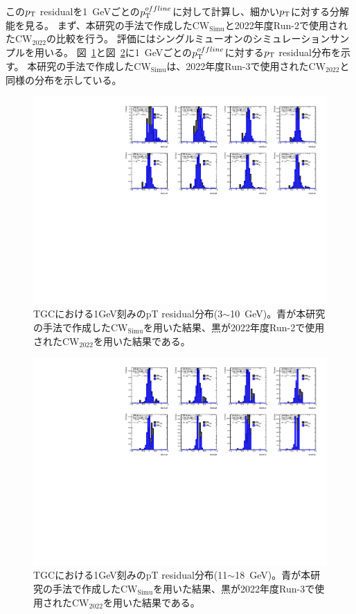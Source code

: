 この$p_{\rm{T}}$ residualを1~GeVごとの$p_{\rm{T}}^{offline}$に対して計算し、細かい$p_{\rm{T}}$に対する分解能を見る。
まず、本研究の手法で作成した$\mathrm{CW_{Simu}}$と2022年度Run-2で使用された$\mathrm{CW_{2022}}$の比較を行う。
評価にはシングルミューオンのシミュレーションサンプルを用いる。
図~\ref{residual_MC_3_10}と図~\ref{residual_MC_11_18}に1~GeVごとの$p_{\rm{T}}^{offline}$に対する$p_{\rm{T}}$ residual分布を示す。
本研究の手法で作成した$\mathrm{CW_{Simu}}$は、2022年度Run-3で使用された$\mathrm{CW_{2022}}$と同様の分布を示している。
\begin{figure}[htb]
  \centering
  \hspace*{-1cm}
  \includegraphics[clip, width=16cm]{fig/5/residual_MC_3_10.pdf}
  \caption{TGCにおける1GeV刻みのpT residual分布(3$\sim$10~GeV)。青が本研究の手法で作成した$\mathrm{CW_{Simu}}$を用いた結果、黒が2022年度Run-2で使用された$\mathrm{CW_{2022}}$を用いた結果である。}
  \label{residual_MC_3_10}
\end{figure}
\begin{figure}[htb]
  \centering
  \hspace*{-1cm}
  \includegraphics[clip, width=16cm]{fig/5/residual_MC_11_18.pdf}
  \caption{TGCにおける1GeV刻みのpT residual分布(11$\sim$18~GeV)。青が本研究の手法で作成した$\mathrm{CW_{Simu}}$を用いた結果、黒が2022年度Run-3で使用された$\mathrm{CW_{2022}}$を用いた結果である。}
  \label{residual_MC_11_18}
\end{figure}
